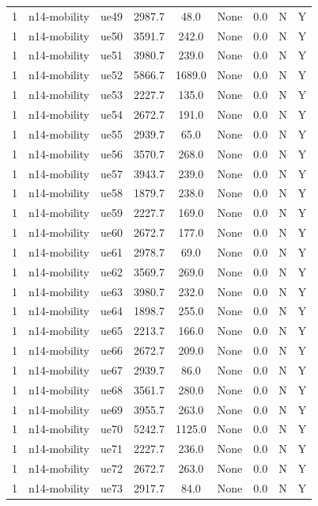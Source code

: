 \begin{table}[ht]
\begin{tabular}{|c|c|c|c|c|c|c|c|c|}
1 & n14-mobility & ue49 & 2987.7 & 48.0 & None & 0.0 & N & Y \\
1 & n14-mobility & ue50 & 3591.7 & 242.0 & None & 0.0 & N & Y \\
1 & n14-mobility & ue51 & 3980.7 & 239.0 & None & 0.0 & N & Y \\
1 & n14-mobility & ue52 & 5866.7 & 1689.0 & None & 0.0 & N & Y \\
1 & n14-mobility & ue53 & 2227.7 & 135.0 & None & 0.0 & N & Y \\
1 & n14-mobility & ue54 & 2672.7 & 191.0 & None & 0.0 & N & Y \\
1 & n14-mobility & ue55 & 2939.7 & 65.0 & None & 0.0 & N & Y \\
1 & n14-mobility & ue56 & 3570.7 & 268.0 & None & 0.0 & N & Y \\
1 & n14-mobility & ue57 & 3943.7 & 239.0 & None & 0.0 & N & Y \\
1 & n14-mobility & ue58 & 1879.7 & 238.0 & None & 0.0 & N & Y \\
1 & n14-mobility & ue59 & 2227.7 & 169.0 & None & 0.0 & N & Y \\
1 & n14-mobility & ue60 & 2672.7 & 177.0 & None & 0.0 & N & Y \\
1 & n14-mobility & ue61 & 2978.7 & 69.0 & None & 0.0 & N & Y \\
1 & n14-mobility & ue62 & 3569.7 & 269.0 & None & 0.0 & N & Y \\
1 & n14-mobility & ue63 & 3980.7 & 232.0 & None & 0.0 & N & Y \\
1 & n14-mobility & ue64 & 1898.7 & 255.0 & None & 0.0 & N & Y \\
1 & n14-mobility & ue65 & 2213.7 & 166.0 & None & 0.0 & N & Y \\
1 & n14-mobility & ue66 & 2672.7 & 209.0 & None & 0.0 & N & Y \\
1 & n14-mobility & ue67 & 2939.7 & 86.0 & None & 0.0 & N & Y \\
1 & n14-mobility & ue68 & 3561.7 & 280.0 & None & 0.0 & N & Y \\
1 & n14-mobility & ue69 & 3955.7 & 263.0 & None & 0.0 & N & Y \\
1 & n14-mobility & ue70 & 5242.7 & 1125.0 & None & 0.0 & N & Y \\
1 & n14-mobility & ue71 & 2227.7 & 236.0 & None & 0.0 & N & Y \\
1 & n14-mobility & ue72 & 2672.7 & 263.0 & None & 0.0 & N & Y \\
1 & n14-mobility & ue73 & 2917.7 & 84.0 & None & 0.0 & N & Y \\

\end{tabular}
\end{table}
